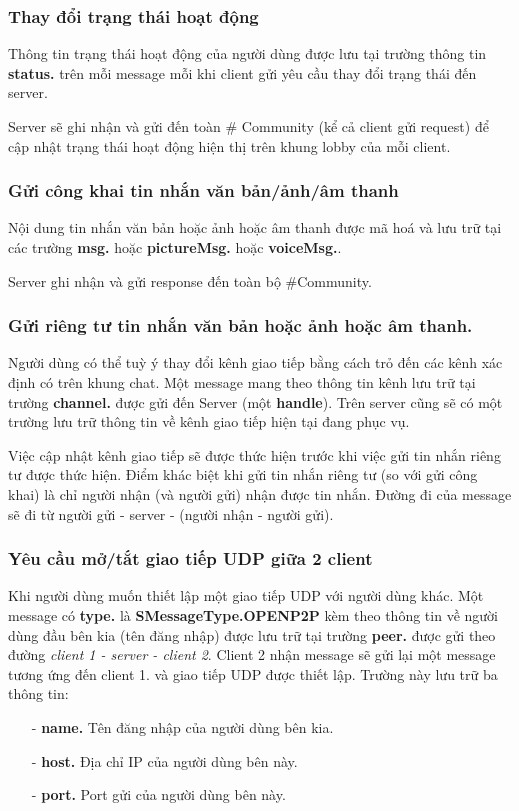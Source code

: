 \documentclass[a4paper]{article}
\begin{document}
\subsubsection{Thay đổi trạng thái hoạt động}
Thông tin trạng thái hoạt động của người dùng được lưu tại trường thông tin {\bf status.} trên mỗi message mỗi khi client gửi yêu cầu thay đổi trạng thái đến server.

Server sẽ ghi nhận và gửi đến toàn \# Community (kể cả client gửi request) để cập nhật trạng thái hoạt động hiện thị trên khung lobby của mỗi client.


\subsubsection{Gửi công khai tin nhắn văn bản/ảnh/âm thanh}
Nội dung tin nhắn văn bản hoặc ảnh hoặc âm thanh được mã hoá và lưu trữ tại các trường {\bf msg.} hoặc {\bf pictureMsg.} hoặc {\bf voiceMsg.}.

Server ghi nhận và gửi response đến toàn bộ \#Community.

\subsubsection{Gửi riêng tư tin nhắn văn bản hoặc ảnh hoặc âm thanh.}
Người dùng có thể tuỳ ý thay đổi kênh giao tiếp bằng cách trỏ đến các kênh xác định có trên khung chat. Một message mang theo thông tin kênh lưu trữ tại trường {\bf channel.} được gửi đến Server (một {\bf handle}). Trên server cũng sẽ có một trường lưu trữ thông tin về kênh giao tiếp hiện tại đang phục vụ. 

Việc cập nhật kênh giao tiếp sẽ được thức hiện trước khi việc gửi tin nhắn riêng tư được thức hiện.  Điểm khác biệt khi gửi tin nhắn riêng tư (so với gửi công khai) là chỉ người nhận (và người gửi) nhận được tin nhắn. Đường đi của message sẽ đi từ người gửi - server - (người nhận - người gửi).

\subsubsection{Yêu cầu mở/tắt giao tiếp UDP giữa 2 client}
 Khi người dùng muốn thiết lập một giao tiếp UDP với người dùng khác. Một message có {\bf type.} là {\bf SMessageType.OPENP2P} kèm theo thông tin về người dùng đầu bên kia (tên đăng nhập) được lưu trữ tại trường {\bf peer.} được gửi theo đường {\it client 1 - server - client 2}. Client 2 nhận message sẽ gửi lại một message tương ứng đến client 1. và giao tiếp UDP được thiết lập. 
Trường này lưu trữ ba thông tin: 
 	\begin{itemize}
		\item[-] {\bf name.} Tên đăng nhập của người dùng bên kia.
		\item[-] {\bf host.} Địa chỉ IP của người dùng bên này.
		\item[-] {\bf port.} Port gửi của người dùng bên này.
	\end{itemize} 
	
\end{document}
